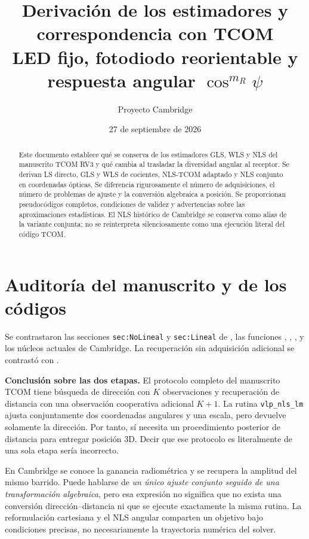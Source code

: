 \documentclass[11pt,a4paper]{article}
\title{Derivación de los estimadores y correspondencia con TCOM\\\large LED fijo, fotodiodo reorientable y respuesta angular $\cos^{m_R}\psi$}
\author{Proyecto Cambridge}
\date{27 de septiembre de 2026}
\begin{document}
\maketitle
\begin{abstract}
Este documento establece qué se conserva de los estimadores GLS, WLS y NLS del manuscrito TCOM RV3 y qué cambia al trasladar la diversidad angular al receptor. Se derivan LS directo, GLS y WLS de cocientes, NLS-TCOM adaptado y NLS conjunto en coordenadas ópticas. Se diferencia rigurosamente el número de adquisiciones, el número de problemas de ajuste y la conversión algebraica a posición. Se proporcionan pseudocódigos completos, condiciones de validez y advertencias sobre las aproximaciones estadísticas. El NLS histórico de Cambridge se conserva como alias de la variante conjunta; no se reinterpreta silenciosamente como una ejecución literal del código TCOM.
\end{abstract}
\tableofcontents
\clearpage

\section{Auditoría del manuscrito y de los códigos}
Se contrastaron las secciones \texttt{sec:NoLineal} y \texttt{sec:Lineal} de , las funciones , , , y los núcleos actuales de Cambridge. La recuperación sin adquisición adicional se contrastó con .

\textbf{Conclusión sobre las dos etapas.} El protocolo completo del manuscrito TCOM \cite{tcom} tiene búsqueda de dirección con $K$ observaciones y recuperación de distancia con una observación cooperativa adicional $K+1$. La rutina \texttt{vlp\_nls\_lm} ajusta conjuntamente dos coordenadas angulares y una escala, pero devuelve solamente la dirección. Por tanto, sí necesita un procedimiento posterior de distancia para entregar posición 3D. Decir que ese protocolo es literalmente de una sola etapa sería incorrecto.

En Cambridge se conoce la ganancia radiométrica y se recupera la amplitud del mismo barrido. Puede hablarse de \emph{un único ajuste conjunto seguido de una transformación algebraica}, pero esa expresión no significa que no exista una conversión dirección--distancia ni que se ejecute exactamente la misma rutina. La reformulación cartesiana y el NLS angular comparten un objetivo bajo condiciones precisas, no necesariamente la trayectoria numérica del solver.
\end{document}
